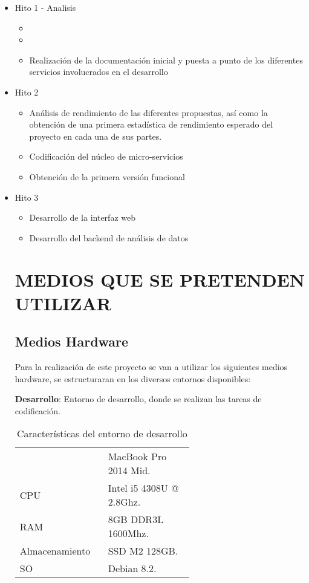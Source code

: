 \documentclass{pre-tfg}
\begin{document}
\begin{itemize}
\item Hito 1 - Analisis
  \begin{itemize}
  \item 
  \item 
  \item Realización de la documentación inicial y puesta a punto de los
    diferentes servicios involucrados en el desarrollo
  \end{itemize}

\item Hito 2
  \begin{itemize}
  \item Análisis de rendimiento de las diferentes propuestas, así como la
    obtención de una primera estadística de rendimiento esperado del proyecto en cada
    una de sus partes.
  \item Codificación del núcleo de micro-servicios
  \item Obtención de la primera versión funcional
  \end{itemize}

\item Hito 3
  \begin{itemize}
  \item Desarrollo de la interfaz web
  \item Desarrollo del backend de análisis de datos
  \end{itemize}

\clearpage
\section{MEDIOS QUE SE PRETENDEN UTILIZAR}

\subsection{Medios Hardware}

Para la realización de este proyecto se van a utilizar los siguientes medios hardware, se
estructuraran en los diversos entornos disponibles:

\textbf{Desarrollo}:
Entorno de desarrollo, donde se realizan las tareas de codificación.

\begin{table}[hp]
  \caption{Características del entorno de desarrollo}
  \centering

  \begin{tabular}{p{0.2\linewidth}p{0.4\linewidth}}
    & MacBook Pro 2014 Mid.\\
    CPU& Intel i5 4308U @ 2.8Ghz.\\
    RAM& 8GB DDR3L 1600Mhz.\\
    Almacenamiento& SSD M2 128GB.\\
    SO& Debian 8.2.\\
  \end{tabular}
\end{table}


\end{itemize}
\end{document}
